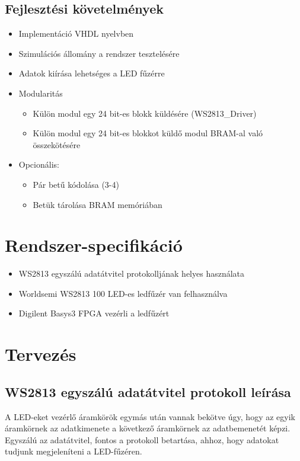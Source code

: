 \documentclass[10pt]{article} %
\begin{document}
\subsection{Fejlesztési követelmények}
\begin{itemize}
\item Implementáció VHDL nyelvben
\item Szimulációs állomány a rendszer tesztelésére
\item Adatok kiírása lehetséges a LED fűzérre
\item Modularitás
\begin{itemize}
	\item Külön modul egy 24 bit-es blokk küldésére (WS2813\_Driver)
	\item Külön modul egy 24 bit-es blokkot küldő modul BRAM-al való összekötésére
\end{itemize}
\item Opcionális: 
\begin{itemize}
	\item Pár betű kódolása (3-4)
	\item Betük tárolása BRAM memóriában
\end{itemize}
\end{itemize}

\section{Rendszer-specifikáció}

\begin{itemize}
\item WS2813 egyszálú adatátvitel protokolljának helyes használata
\item Worldsemi WS2813 100 LED-es ledfűzér van felhasználva
\item Digilent Basys3 FPGA vezérli a ledfűzért 
\end{itemize}

\section{Tervezés}


\subsection{WS2813 egyszálú adatátvitel protokoll leírása}

\indent A LED-eket vezérlő áramkörök egymás után vannak bekötve úgy, hogy az egyik áramkörnek az adatkimenete a következő áramkörnek az adatbemenetét képzi. Egyszálú az adatátvitel, fontos a protokoll betartása, ahhoz, hogy adatokat tudjunk megjeleníteni a LED-fűzéren.
\end{document}
